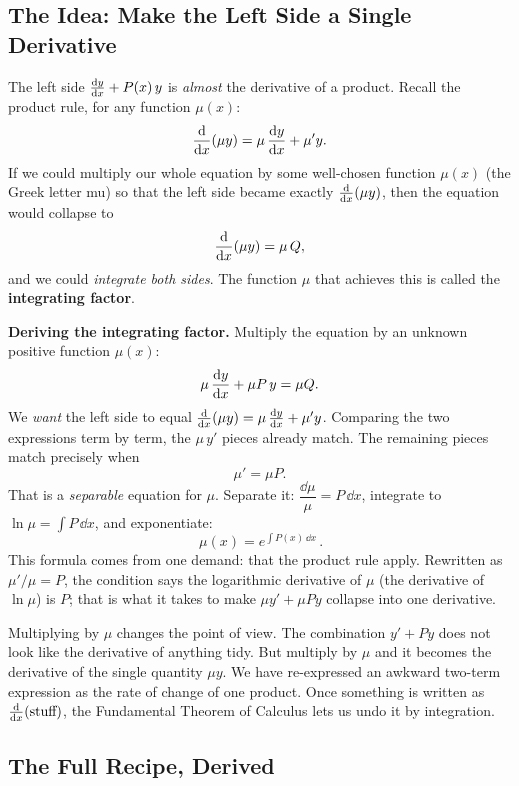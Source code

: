 \subsection{The Idea: Make the Left Side a Single Derivative}

The left side $\frac{\mathrm{d} y}{\mathrm{d} x} + P(x)\,y$ is \emph{almost} the
derivative of a product. Recall the product rule, for any function $\mu(x)$:
\[
  \frac{\mathrm{d}}{\mathrm{d} x}\!\left(\mu y\right) = \mu\,\frac{\mathrm{d} y}{\mathrm{d} x} + \mu' y.
\]
If we could multiply our whole equation by some well-chosen function
$\mu(x)$ (the Greek letter mu) so that the left side became exactly $\frac{\mathrm{d}}{\mathrm{d} x}\!\left(\mu y\right)$,
then the equation would collapse to
\[
  \frac{\mathrm{d}}{\mathrm{d} x}\!\left(\mu y\right) = \mu\,Q,
\]
and we could \emph{integrate both sides}. The function $\mu$ that
achieves this is called the \textbf{integrating factor}.

\begin{whybox}
\textbf{Deriving the integrating factor.} Multiply the equation by an unknown
positive function $\mu(x)$:
\[
  \mu\,\frac{\mathrm{d} y}{\mathrm{d} x} + \mu P\,y = \mu Q.
\]
We \emph{want} the left side to equal $\frac{\mathrm{d}}{\mathrm{d} x}\!\left(\mu y\right) = \mu\,\frac{\mathrm{d} y}{\mathrm{d} x} + \mu' y$.
Comparing the two expressions term by term, the $\mu\,y'$ pieces already match. The
remaining pieces match precisely when
\[
  \mu' = \mu P.
\]
That is a \emph{separable} equation for $\mu$. Separate it:
$\dfrac{\dd\mu}{\mu} = P\,\dd x$, integrate to $\ln\mu = \int P\,\dd x$, and
exponentiate:
\[
  \boxed{\,\mu(x) = e^{\int P(x)\,\dd x}\,}.
\]
This formula comes from one demand: that the product rule apply. Rewritten as
$\mu'/\mu = P$, the condition says the logarithmic derivative of $\mu$ (the
derivative of $\ln\mu$) is $P$; that is what it takes to make
$\mu y'+\mu P y$ collapse into one derivative.
\end{whybox}

\begin{happeningbox}
Multiplying by $\mu$ changes the point of view. The combination
$y' + Py$ does not look like the derivative of anything tidy. But multiply by $\mu$
and it becomes the derivative of the single quantity $\mu y$. We have re-expressed
an awkward two-term expression as the rate of change of one product. Once something
is written as $\frac{\mathrm{d}}{\mathrm{d} x}\!\left(\text{stuff}\right)$, the Fundamental Theorem of Calculus lets us undo
it by integration.
\end{happeningbox}

\subsection{The Full Recipe, Derived}

